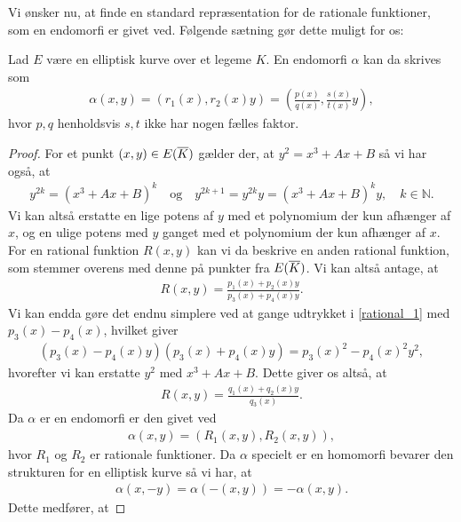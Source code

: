 Vi ønsker nu, at finde en standard repræsentation for de rationale funktioner, som en endomorfi er givet ved. Følgende sætning gør dette muligt for os:

\begin{theorem}
\label{end_rep_theorem}
Lad $E$ være en elliptisk kurve over et legeme $K$. En endomorfi $\alpha$ kan da skrives som
\begin{align*}
	\alpha(x, y) = (r_1(x), r_2(x)y) = \left( \frac{p(x)}{q(x)}, \frac{s(x)}{t(x)}y \right),
\end{align*}
hvor $p, q$ henholdsvis $s, t$ ikke har nogen fælles faktor.
\end{theorem}
\begin{proof}
For et punkt $(x, y) \in E(\overline{K})$ gælder der, at $y^2 = x^3 + Ax + B$ så vi har også, at 
\begin{align*}
	y^{2k} = (x^3 + Ax + B)^k \quad \text{og} \quad y^{2k+1}= y^{2k}y = (x^3 + Ax + B)^k y, \quad k \in \mathbb{N}.
\end{align*}
Vi kan altså erstatte en lige potens af $y$ med et polynomium der kun afhænger af $x$, og en ulige potens med $y$ ganget med et polynomium der kun afhænger af $x$. For en rational funktion $R(x, y)$ kan vi da beskrive en anden rational funktion, som stemmer overens med denne på punkter fra $E(\overline{K})$. Vi kan altså antage, at
\begin{align}
	\label{rational_1}
	R(x, y) = \frac{p_1(x) + p_2(x)y}{p_3(x)+p_4(x)y}.
\end{align}
Vi kan endda gøre det endnu simplere ved at gange udtrykket i \eqref{rational_1} med $p_3(x)-p_4(x)$, hvilket giver 
\begin{align*}
	(p_3(x) - p_4(x)y)(p_3(x)+p_4(x)y) = p_3(x)^2 - p_4(x)^2 y^2,
\end{align*}
hvorefter vi kan erstatte $y^2$ med $x^3 + Ax + B$. Dette giver os altså, at 
\begin{align}
	\label{rational_final}
	R(x, y) = \frac{q_1(x) + q_2(x)y}{q_3(x)}.
\end{align}
Da $\alpha$ er en endomorfi er den givet ved
\begin{align*}
	\alpha(x, y) = (R_1(x, y), R_2(x, y)),
\end{align*}
hvor $R_1$ og $R_2$ er rationale funktioner. Da $\alpha$ specielt er en homomorfi bevarer den strukturen for en elliptisk kurve så vi har, at
\begin{align*}
	\alpha(x, -y) = \alpha(-(x, y)) =  -\alpha(x, y).
\end{align*}
Dette medfører, at 

\end{proof}
